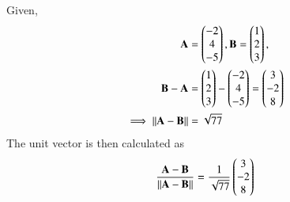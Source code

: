 Given, 
\begin{align}
\mathbf {A}&=\begin{pmatrix}-2\\4\\-5\end{pmatrix}, \mathbf {B}=\begin{pmatrix}1\\2\\3\end{pmatrix},
\\
\mathbf{B}-\mathbf{A}    &=\begin{pmatrix}1\\2\\3\end{pmatrix} - \begin{pmatrix}-2\\4\\-5\end{pmatrix}
     =\begin{pmatrix}3\\-2\\8\end{pmatrix}
     \\
     \implies 
\left\lVert\mathbf{A}-\mathbf{B}\right\rVert &=\sqrt{77}
    \end{align}
The unit vector is then calculated as
\begin{align}
\frac{\mathbf{A}-\mathbf{B}}{\left\lVert\mathbf{A}-\mathbf{B}\right\rVert}
    =\frac{1}{\sqrt{77}}\begin{pmatrix}3\\-2\\8\end{pmatrix}
\end{align}